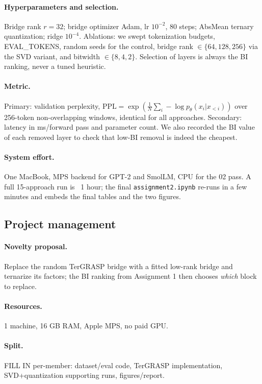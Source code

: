 \documentclass[11pt]{article}
\begin{document}
\paragraph{Hyperparameters and selection.} Bridge rank $r{=}32$; bridge
optimizer Adam, lr $10^{-2}$, 80 steps; AbsMean ternary quantization;
ridge $10^{-4}$. Ablations: we swept tokenization budgets, EVAL\_TOKENS,
random seeds for the control, bridge rank $\in\{64,128,256\}$ via the SVD
variant, and bitwidth $\in\{8,4,2\}$. Selection of layers is always the BI
ranking, never a tuned heuristic.
\paragraph{Metric.} Primary: validation perplexity,
$\mathrm{PPL}=\exp(\frac{1}{N}\sum_i -\log p_\theta(x_i|x_{<i}))$ over
256-token non-overlapping windows, identical for all approaches.
Secondary: latency in ms/forward pass and parameter count. We also
recorded the BI value of each removed layer to check that low-BI removal
is indeed the cheapest.
\paragraph{System effort.} One MacBook, MPS backend for GPT-2 and SmolLM,
CPU for the 02 pass. A full 15-approach run is ~1 hour; the final
\texttt{assignment2.ipynb} re-runs in a few minutes and embeds the final
tables and the two figures.

\subsection{Project management}
\paragraph{Novelty proposal.} Replace the random TerGRASP bridge with a
fitted low-rank bridge and ternarize its factors; the BI ranking from
Assignment 1 then chooses \emph{which} block to replace.
\paragraph{Resources.} 1 machine, 16 GB RAM, Apple MPS, no paid GPU.
\paragraph{Split.} FILL IN per-member: dataset/eval code, TerGRASP
implementation, SVD+quantization supporting runs, figures/report.
\end{document}
